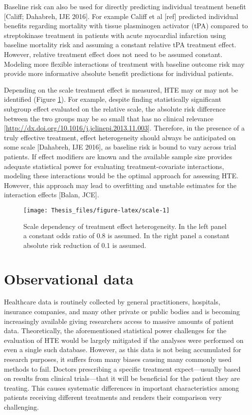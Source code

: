 \documentclass[
]{book}
\begin{document}
Baseline risk can also be used for directly predicting individual treatment
benefit {[}Califf; Dahabreh, IJE 2016{]}. For example Califf et al {[}ref{]} predicted
individual benefits regarding mortality with tissue plasminogen activator (tPA)
compared to streptokinase treatment in patients with acute myocardial infarction
using baseline mortality risk and assuming a constant relative tPA treatment
effect. However, relative treatment effect does not need to be assumed
constant. Modeling more flexible interactions of treatment with baseline outcome
risk may provide more informative absolute benefit predictions for individual
patients.

Depending on the scale treatment effect is measured, HTE may or may not be
identified (Figure \ref{fig:scale}). For example, despite finding statistically
significant subgroup effect evaluated on the relative scale, the absolute risk
difference between the two groups may be so small that has no clinical relevance
{[}\url{http://dx.doi.org/10.1016/j.jclinepi.2013.11.003}{]}. Therefore, in the presence
of a truly effective treatment, effect heterogeneity should always be
anticipated on some scale {[}Dahabreh, IJE 2016{]}, as baseline risk is bound to
vary across trial patients. If effect modifiers are known and the available
sample size provides adequate statistical power for evaluating
treatment-covariate interactions, modeling these interactions would be the
optimal approach for assessing HTE. However, this approach may lead to
overfitting and unstable estimates for the interaction effects {[}Balan, JCE{]}.

\begin{figure}
\texttt{[image: Thesis\_files/figure-latex/scale-1]} \caption{Scale dependency of treatment effect heterogeneity. In the left panel a constant odds ratio of 0.8 is assumed. In the right panel a constant absolute risk reduction of 0.1 is assumed.}\label{fig:scale}
\end{figure}

\hypertarget{observational-data}{%
\section{Observational data}\label{observational-data}}

Healthcare data is routinely collected by general practitioners, hospitals,
insurance companies, and many other private or public bodies and is becoming
increasingly available giving researchers access to massive amounts of patient
data. Theoretically, the aforementioned statistical power challenges for the
evaluation of HTE would be largely mitigated if the analyses were performed on
even a single such database. However, as this data is not being accumulated for
research purposes, it suffers from many biases causing many commonly used
methods to fail. Doctors prescribing a specific treatment expect---usually based
on results from clinical trials---that it will be beneficial for the patient
they are treating. This causes systematic differences in important
characteristics among patients receiving different treatments and renders their
comparison very challenging.
\end{document}
